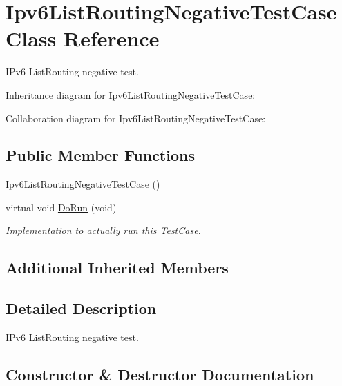 \hypertarget{classIpv6ListRoutingNegativeTestCase}{}\section{Ipv6\+List\+Routing\+Negative\+Test\+Case Class Reference}
\label{classIpv6ListRoutingNegativeTestCase}


I\+Pv6 List\+Routing negative test.  




Inheritance diagram for Ipv6\+List\+Routing\+Negative\+Test\+Case\+:


Collaboration diagram for Ipv6\+List\+Routing\+Negative\+Test\+Case\+:
\subsection*{Public Member Functions}
\begin{DoxyCompactItemize}
\item 
\hyperlink{classIpv6ListRoutingNegativeTestCase_a9b7bf3020fda23e8987af4800301b182}{Ipv6\+List\+Routing\+Negative\+Test\+Case} ()
\item 
virtual void \hyperlink{classIpv6ListRoutingNegativeTestCase_a85331aa5a708914cbe177f8c846897c6}{Do\+Run} (void)
\begin{DoxyCompactList}\small\item\em Implementation to actually run this Test\+Case. \end{DoxyCompactList}\end{DoxyCompactItemize}
\subsection*{Additional Inherited Members}


\subsection{Detailed Description}
I\+Pv6 List\+Routing negative test. 

\subsection{Constructor \& Destructor Documentation}
